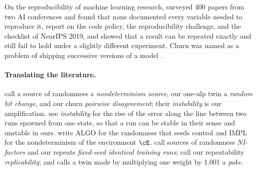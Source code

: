\begin{refsection}
On the reproducibility of machine learning research, \textcite{GundersenKjensmo2018} surveyed 400 papers from two AI conferences and found that none documented every variable needed to reproduce it, \textcite{PineauEtAl2021} report on the code policy, the reproducibility challenge, and the checklist of NeurIPS 2019, and \textcite{BouthillierEtAl2019} showed that a result can be repeated exactly and still fail to hold under a slightly different experiment. Churn was named as a problem of shipping successive versions of a model \parencite{MilaniFardEtAl2016}.

\paragraph{Translating the literature.} \Textcite{SummersDinneen2021} call a source of randomness a \emph{nondeterminism source}, our one-ulp twin a \emph{random bit change}, and our churn \emph{pairwise disagreement}; their \emph{instability} is our amplification. \Textcite{FrankleEtAl2020} use \emph{instability} for the rise of the error along the line between two runs spawned from one state, so that a run can be stable in their sense and unstable in ours. \Textcite{ZhuangEtAl2022} write ALGO for the randomness that seeds control and IMPL for the nondeterminism of the environment $\cE$. \Textcite{PhamEtAl2020} call sources of randomness \emph{NI-factors} and our repeats \emph{fixed-seed identical training runs}; \textcite{NagarajanEtAl2018} call our repeatability \emph{replicability}; and \textcite{Jordan2024} calls a twin made by multiplying one weight by 1.001 a \emph{poke}.

\printchapterbib
\end{refsection}
